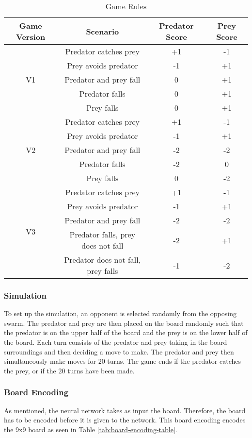 \begin{table}
  \centering
  \begin{tabular}{|c|c|c|c|}
    \hline
    Game Version & Scenario & Predator Score & Prey Score\\
    \hline
    \multirow{ 5}{*}{V1} & Predator catches prey & +1 & -1 \\
    & Prey avoids predator & -1 & +1\\ 
    & Predator and prey fall & 0 & +1 \\
    & Predator falls & 0 & +1 \\
    & Prey falls & 0 & +1 \\
    \hline
    \multirow{ 5}{*}{V2} & Predator catches prey& +1 & -1\\
    & Prey avoids predator & -1 & +1\\ 
    & Predator and prey fall & -2 & -2 \\
    & Predator falls & -2 & 0 \\
    & Prey falls & 0 & -2 \\
    \hline
    \multirow{ 5}{*}{V3} &  Predator catches prey & +1 & -1\\
    & Prey avoids predator & -1 & +1\\
    & Predator and prey fall & -2 & -2\\
    & Predator falls, prey does not fall & -2 & +1 \\
    & Predator does not fall, prey falls & -1 & -2 \\
    \hline
  \end{tabular}
  \caption{Game Rules}
  \label{tab:game-rules}
\end{table}

\subsubsection{Simulation}
To set up the simulation, an opponent is selected randomly from the opposing swarm. The predator and prey are then placed on the board randomly such that the predator is on the upper half of the board and the prey is on the lower half of the board. Each turn consists of the predator and prey taking in the board surroundings and then deciding a move to make. The predator and prey then simultaneously make moves for 20 turns. The game ends if the predator catches the prey, or if the 20 turns have been made. 

\subsubsection{Board Encoding}
As mentioned, the neural network takes as input the board. Therefore, the board has to be encoded before it is given to the network. This board encoding encodes the 9x9 board as seen in Table \ref{tab:board-encoding-table}.

